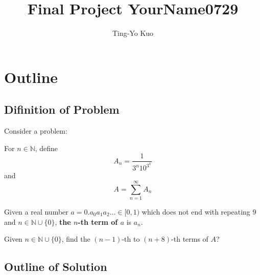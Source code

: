 \documentclass[paper=a4]{scrartcl}
\title{Final Project YourName0729}
\author{Ting-Yo Kuo}
\date{}
\begin{document}
\maketitle
\setcounter{section}{0}
\section{Outline}
\subsection{Difinition of Problem}
Consider a problem:

\begin{tcolorbox}[arc=0pt,colback=white,title={Definition}]
For $n\in\mathbb{N}$, define 
\[
A_n=\frac{1}{3^n10^{3^k}}
\]
and
\[
A=\sum_{n=1}^\infty A_n
\]
\end{tcolorbox}
\begin{tcolorbox}[arc=0pt,colback=white,title={Definition}]
Given a real number $a=0.a_0a_1a_2\ldots\in[0,1)$ which does not end with repeating 9 and $n\in\mathbb{N}\cup\{0\}$, \textbf{the $n$-th term of $a$} is $a_n$.
\end{tcolorbox}
\begin{tcolorbox}[arc=0pt,colback=white,title={Problem}]
Given $n\in\mathbb{N}\cup\{0\}$, find the $(n-1)$-th to $(n+8)$-th terms of $A$?
\end{tcolorbox}

\subsection{Outline of Solution}
\end{document}
